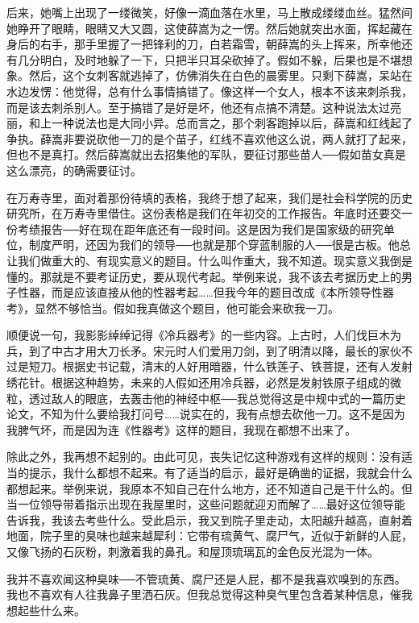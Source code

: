 后来，她嘴上出现了一缕微笑，好像一滴血落在水里，马上散成缕缕血丝。猛然间她睁开了眼睛，眼睛又大又圆，这使薛嵩为之一愣。然后她就突出水面，挥起藏在身后的右手，那手里握了一把锋利的刀，白若霜雪，朝薛嵩的头上挥来，所幸他还有几分明白，及时地躲了一下，只把半只耳朵砍掉了。假如不躲，后果也是不堪想象。然后，这个女刺客就逃掉了，仿佛消失在白色的晨雾里。只剩下薛嵩，呆站在水边发愣：他觉得，总有什么事情搞错了。像这样一个女人，根本不该来刺杀我，而是该去刺杀别人。至于搞错了是好是坏，他还有点搞不清楚。这种说法太过亮丽，和上一种说法也是大同小异。总而言之，那个刺客跑掉以后，薛嵩和红线起了争执。薛嵩非要说砍他一刀的是个苗子，红线不喜欢他这么说，两人就打了起来，但也不是真打。然后薛嵩就出去招集他的军队，要征讨那些苗人──假如苗女真是这么漂亮，的确需要征讨。 

在万寿寺里，面对着那份待填的表格，我终于想了起来，我们是社会科学院的历史研究所，在万寿寺里借住。这份表格是我们在年初交的工作报告。年底时还要交一份考绩报告──好在现在距年底还有一段时间。这是因为我们是国家级的研究单位，制度严明，还因为我们的领导──也就是那个穿蓝制服的人──很是古板。他总让我们做重大的、有现实意义的题目。什么叫作重大，我不知道。现实意义我倒是懂的。那就是不要考证历史，要从现代考起。举例来说，我不该去考据历史上的男子性器，而是应该直接从他的性器考起……但我今年的题目改成《本所领导性器考》，显然不够恰当。假如我真做这个题目，他可能会来砍我一刀。 

顺便说一句，我影影绰绰记得《冷兵器考》的一些内容。上古时，人们伐巨木为兵，到了中古才用大刀长矛。宋元时人们爱用刀剑，到了明清以降，最长的家伙不过是短刀。根据史书记载，清末的人好用暗器，什么铁莲子、铁菩提，还有人发射绣花针。根据这种趋势，未来的人假如还用冷兵器，必然是发射铁原子组成的微粒，透过敌人的眼底，去轰击他的神经中枢──我总觉得这是中规中式的一篇历史论文，不知为什么要给我打问号……说实在的，我有点想去砍他一刀。这不是因为我脾气坏，而是因为连《性器考》这样的题目，我现在都想不出来了。 

除此之外，我再想不起别的。由此可见，丧失记忆这种游戏有这样的规则：没有适当的提示，我什么都想不起来。有了适当的启示，最好是确凿的证据，我就会什么都想起来。举例来说，我原本不知自己在什么地方，还不知道自己是干什么的。但当一位领导带着指示出现在我屋里时，这些问题就迎刃而解了……最好这位领导能告诉我，我该去考些什么。受此启示，我又到院子里走动，太阳越升越高，直射着地面，院子里的臭味也越来越犀利：它带有琉黄气、腐尸气，近似于新鲜的人屁，又像飞扬的石灰粉，刺激着我的鼻孔。和屋顶琉璃瓦的金色反光混为一体。 

我并不喜欢闻这种臭味──不管琉黄、腐尸还是人屁，都不是我喜欢嗅到的东西。我也不喜欢有人往我鼻子里洒石灰。但我总觉得这种臭气里包含着某种信息，催我想起些什么来。 

